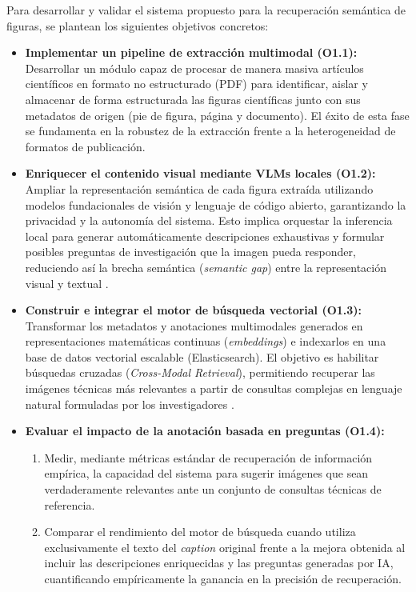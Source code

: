 \documentclass[a4paper]{report}
\begin{document}
Para desarrollar y validar el sistema propuesto para la recuperación semántica de figuras, se plantean los siguientes objetivos concretos:

\begin{itemize}
    \item \textbf{Implementar un pipeline de extracción multimodal (O1.1):} Desarrollar un módulo capaz de procesar de manera masiva artículos científicos en formato no estructurado (PDF) para identificar, aislar y almacenar de forma estructurada las figuras científicas junto con sus metadatos de origen (pie de figura, página y documento). El éxito de esta fase se fundamenta en la robustez de la extracción frente a la heterogeneidad de formatos de publicación.

    \item \textbf{Enriquecer el contenido visual mediante VLMs locales (O1.2):} Ampliar la representación semántica de cada figura extraída utilizando modelos fundacionales de visión y lenguaje de código abierto, garantizando la privacidad y la autonomía del sistema. Esto implica orquestar la inferencia local para generar automáticamente descripciones exhaustivas y formular posibles preguntas de investigación que la imagen pueda responder, reduciendo así la brecha semántica (\textit{semantic gap}) entre la representación visual y textual \cite{radford2021learning}.

    \item \textbf{Construir e integrar el motor de búsqueda vectorial (O1.3):} Transformar los metadatos y anotaciones multimodales generados en representaciones matemáticas continuas (\textit{embeddings}) e indexarlos en una base de datos vectorial escalable (Elasticsearch). El objetivo es habilitar búsquedas cruzadas (\textit{Cross-Modal Retrieval}), permitiendo recuperar las imágenes técnicas más relevantes a partir de consultas complejas en lenguaje natural formuladas por los investigadores \cite{baltruvsaitis2018multimodal}.

    \item \textbf{Evaluar el impacto de la anotación basada en preguntas (O1.4):} 
    \begin{enumerate}
        \item[a)] Medir, mediante métricas estándar de recuperación de información empírica, la capacidad del sistema para sugerir imágenes que sean verdaderamente relevantes ante un conjunto de consultas técnicas de referencia.
        \item[b)] Comparar el rendimiento del motor de búsqueda cuando utiliza exclusivamente el texto del \textit{caption} original frente a la mejora obtenida al incluir las descripciones enriquecidas y las preguntas generadas por IA, cuantificando empíricamente la ganancia en la precisión de recuperación.
    \end{enumerate}
\end{itemize}
\end{document}
